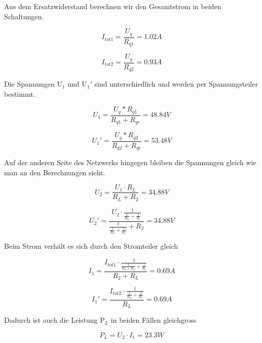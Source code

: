Aus dem Ersatzwiderstand berechnen wir den Gesamtstrom in beiden Schaltungen. 

\begin{equation}\label{equ:itot1}
    I_{tot1} = \frac{U_{q}}{R_{q1}} =  1.02A 
  \end{equation}
  
\begin{equation}\label{equ:itot2}
    I_{tot2} = \frac{U_{q}}{R_{q2}} =  0.93A 
  \end{equation}		
  
 Die Spannungen U$_1$ und U$_1'$ sind unterschiedlich und werden per Spannungsteiler bestimmt. 

\begin{equation}\label{equ:u1}
    U_{1} = \frac{U_{q}*R_{q1}}{R_{q1}+R_{qe}} =  48.84V
  \end{equation}

\begin{equation}\label{equ:u1'}
    U_{1}' = \frac{U_{q}*R_{q2}}{R_{q2}+R_{qe}} =  53.48V
  \end{equation}


Auf der anderen Seite des Netzwerks hingegen bleiben die Spannungen gleich wie man an den Berechnungen sieht.


\begin{equation}\label{equ:u2}
    U_{2} = \frac{U_{1}\cdot{R_{L}}}{R_{L}+R_{2}} =  34.88V
  \end{equation}

\begin{equation}\label{equ:u2'}
    U_{2}' = \frac{U_{2}\cdot{{ \frac{1}{\frac{1}{R_L}+\frac{1}{R_1}}}}}{{{ \frac{1}{\frac{1}{R_L}+\frac{1}{R_1}}}}+R_2} =  34.88V
  \end{equation}
  
Beim Strom verhält es sich durch den Stromteiler gleich

  \begin{equation}\label{equ:u1}
    I_{1} = \frac{ I_{tot1}\cdot \frac{1}{\frac{1}{R_L+R_2}+\frac{1}{R_1}}}{R_{2}+R_{L}} =  0.69A
  \end{equation}
  
    \begin{equation}\label{equ:u1}
    I_{1}' = \frac{I_{tot2} \cdot \frac{1}{\frac{1}{R_L}+\frac{1}{R_1}}}{R_{L}} =  0.69A
  \end{equation}
  
  
  Dadurch ist auch die Leistung P$_L$ in beiden Fällen gleichgross
  
      \begin{equation}\label{equ:u1}
   P_{L} = U_{2} \cdot I_{1} =  23.3W
  \end{equation}
  

